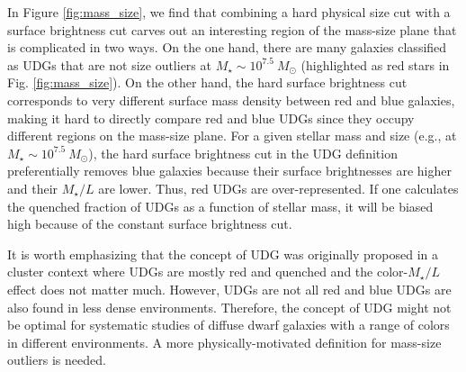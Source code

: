\documentclass[twocolumn,astrosymb,twocolappendix]{aastex631}
\begin{document}
\begin{CJK*}{UTF8}{gbsn}
In Figure \ref{fig:mass_size}, we find that combining a hard physical size cut with a surface brightness cut carves out an interesting region of the mass-size plane that is complicated in two ways. On the one hand, there are many galaxies classified as UDGs that are not size outliers at $M_\star \sim 10^{7.5}\ M_\odot$ (highlighted as red stars in Fig. \ref{fig:mass_size}). On the other hand, the hard surface brightness cut corresponds to very different surface mass density between red and blue galaxies, making it hard to directly compare red and blue UDGs since they occupy different regions on the mass-size plane. For a given stellar mass and size (e.g., at $M_\star \sim 10^{7.5}\ M_\odot$), the hard surface brightness cut in the UDG definition preferentially removes blue galaxies because their surface brightnesses are higher and their $M_\star/L$ are lower. Thus, red UDGs are over-represented. If one calculates the quenched fraction of UDGs as a function of stellar mass, it will be biased high because of the constant surface brightness cut. 

It is worth emphasizing that the concept of UDG was originally proposed in a cluster context where UDGs are mostly red and quenched \citep[e.g.,][]{vanDokkum2015} and the color-$M_\star/L$ effect does not matter much. However, UDGs are not all red and blue UDGs are also found in less dense environments. Therefore, the concept of UDG might not be optimal for systematic studies of diffuse dwarf galaxies with a range of colors in different environments. A more physically-motivated definition for mass-size outliers is needed.



\end{CJK*}
\end{document}
